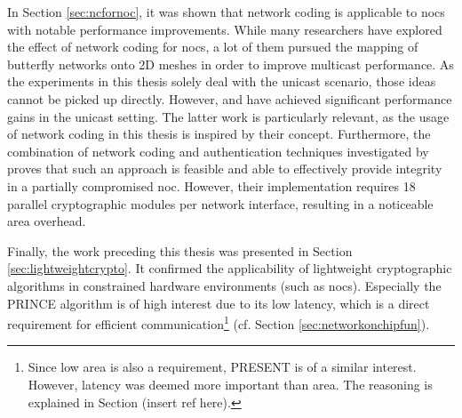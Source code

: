 In Section \ref{sec:ncfornoc}, it was shown that network coding is applicable to \glspl{noc} with notable performance improvements. While many
researchers have explored the effect of network coding for \glspl{noc}, a lot of them pursued the mapping of butterfly networks onto 2D meshes in
order to improve multicast performance. As the experiments in this thesis solely deal with the unicast scenario, those ideas cannot be picked up
directly. However, \citeauthor{duongba11ncinmulticore} \cite{duongba11ncinmulticore} and \citeauthor{moriam15manycorenc} \cite{moriam15manycorenc}
have achieved significant performance gains in the unicast setting. The latter work is particularly relevant, as the usage of network coding in this
thesis is inspired by their concept. Furthermore, the combination of network coding and authentication techniques investigated by
\citeauthor{moriam18activeattackers} \cite{moriam18activeattackers} proves that such an approach is feasible and able to effectively provide integrity
in a partially compromised \gls{noc}. However, their implementation requires 18 parallel cryptographic modules per network interface, resulting in a
noticeable area overhead.

Finally, the work preceding this thesis was presented in Section \ref{sec:lightweightcrypto}. It confirmed the applicability of lightweight
cryptographic algorithms in constrained hardware environments (such as \glspl{noc}). Especially the PRINCE algorithm is of high interest due to its
low latency, which is a direct requirement for efficient communication\footnote{Since low area is also a requirement, PRESENT is of a similar
interest. However, latency was deemed more important than area. The reasoning is explained in Section (insert ref here).} (cf. Section \ref{sec:networkonchipfun}).

\iffalse
